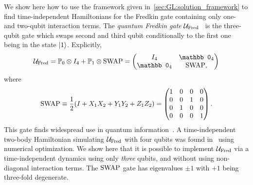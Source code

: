 We show here how to use the framework given in~\cref{sec:GL:solution_framework} to find time-independent Hamiltonians for the Fredkin gate containing only one- and two-qubit interaction terms.
The \emph{quantum Fredkin gate} ${\mathcal{U}}_{\operatorname{Fred}}$~\cite{fredkin1982conservative} is the three-qubit gate which swaps second and third qubit conditionally to the first one being in the state $\ket1$.
Explicitly,
\begin{equation}
    \UFred = \PP_0 \otimes I_4 + \PP_1 \otimes \on{SWAP} =
    \begin{pmatrix}
        I_4 & \mathbb0_4 \\
        \mathbb0_4 & \on{SWAP},
    \end{pmatrix}
\end{equation}
where
\begin{equation}
    \operatorname{SWAP} \equiv
    \frac{1}{2}(I + X_1 X_2 + Y_1 Y_2 + Z_1 Z_2) =
    \begin{pmatrix}
        1 & 0 & 0 & 0 \\
        0 & 0 & 1 & 0 \\
        0 & 1 & 0 & 0 \\
        0 & 0 & 0 & 1
    \end{pmatrix}.
\end{equation}
This gate finds widespread use in quantum information~\cite{buhrman2001quantum,patel2016quantum,loft2018quantum}.
A time-independent two-body Hamiltonian simulating ${\mathcal{U}}_{\operatorname{Fred}}$ with four qubits was found in~\cite{banchi2016quantum} using numerical optimization.
We show here that it is possible to implement ${\mathcal{U}}_{\operatorname{Fred}}$ via a time-independent dynamics using only \textit{three} qubits, and without using non-diagonal interaction terms.
The $\operatorname{SWAP}$ gate has eigenvalues $\pm1$ with $+1$ being three-fold degenerate.
